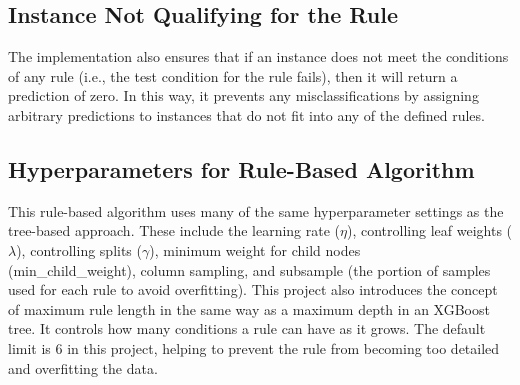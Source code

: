 \documentclass{article}
\begin{document}
\subsection{Instance Not Qualifying for the Rule}
The implementation also ensures that if an instance does not meet the conditions of any rule (i.e., the test condition for the rule fails), then it will return a prediction of zero. In this way, it prevents any misclassifications by assigning arbitrary predictions to instances that do not fit into any of the defined rules. 

\subsection{Hyperparameters for Rule-Based Algorithm}
This rule-based algorithm uses many of the same hyperparameter settings\cite{xgboostparameters} as the tree-based approach. These include the learning rate ($\eta$), controlling leaf weights ($\lambda$), controlling splits ($\gamma$), minimum weight for child nodes \\
(min\_child\_weight), column sampling, and subsample (the portion of samples used for each rule to avoid overfitting). This project also introduces the concept of maximum rule length in the same way as a maximum depth in an XGBoost tree. It controls how many conditions a rule can have as it grows. The default limit is 6 in this project, helping to prevent the rule from becoming too detailed and overfitting the data.
\end{document}
